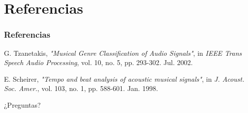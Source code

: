 \documentclass{beamer}
\begin{document}
\section{Referencias}

\begin{frame}
\frametitle{Referencias}

\begin{thebibliography}{9}
  G. Tzanetakis,
  \textit{"Musical Genre Classification of Audio Signals"},
  in \textit{IEEE Trans Speech Audio Processing}, 
  vol. 10, no. 5, pp. 293-302. Jul. 2002.
  
  E. Scheirer,
  \textit{"Tempo and beat analysis of acoustic musical signals"},
  in \textit{J. Acoust. Soc. Amer.}, 
  vol. 103, no. 1, pp. 588-601. Jan. 1998.
\end{thebibliography}

\end{frame}


\begin{frame}
\Huge{\centerline{¿Preguntas?}}
\end{frame}

\end{document}

